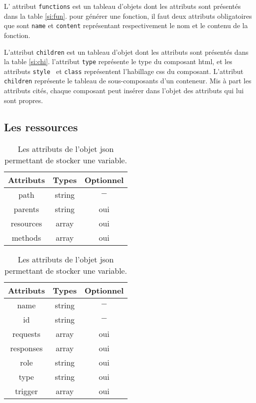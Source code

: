 \documentclass[a4paper,11pt]{report}
\begin{document}
L' attribut  {\tt functions} est un tableau d'objets dont les attributs sont présentés dans la table \ref{si:fun}.
pour générer une fonction, il faut deux attributs obligatoires que sont {\tt name} et {\tt content} représentant
respectivement le nom et le contenu de la fonction.

L'attribut {\tt children} est un tableau d'objet  dont les attributs sont présentés dans la table \ref{si:chi}.
l'attribut {\tt type} représente le type du composant html, et les attributs {\tt style } et {\tt class} représentent
l'habillage css du composant. L'attribut {\tt children} représente le tableau de sous-composants d'un conteneur.
Mis à part les attributs cités, chaque composant peut  insérer dans l'objet des attributs qui lui sont propres.


\subsection{Les ressources}

\begin{table}[ht]
 \begin{tabular}{|c|c|c|}
   \hline
   Attributs & Types & Optionnel \\
   \hline
   path  & string &  $-$ \\
    \hline
   parents &  string & oui\\
    \hline
   resources &  array & oui\\
    \hline
   methods &  array & oui\\
    \hline
    
  \end{tabular}
 \caption{Les attributs de l'objet  json permettant de stocker une variable. \label{si:res} }
\end{table} 

\begin{table}[ht]
 \begin{tabular}{|c|c|c|}
   \hline
   Attributs & Types & Optionnel \\
   \hline
   name  & string &  $-$ \\
    \hline
   id &  string & $-$\\
    \hline
   requests &  array & oui\\
    \hline
   responses &  array & oui\\
    \hline
   role  & string &  oui \\
    \hline
   type &  string & oui\\
    \hline
   trigger &  array & oui\\
    \hline
     
  \end{tabular}
 \caption{Les attributs de l'objet  json permettant de stocker une variable. \label{si:res} }
\end{table}
\end{document}
